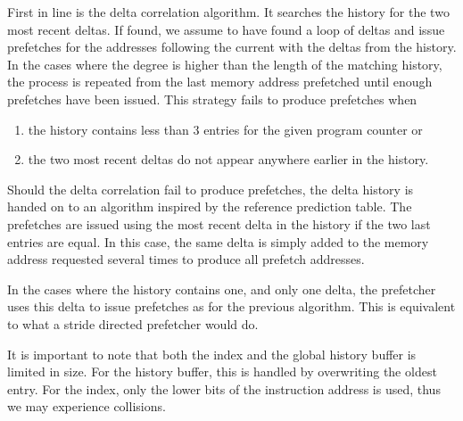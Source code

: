 First in line is the delta correlation algorithm.
It searches the history for the two most recent deltas.
If found, we assume to have found a loop of deltas and issue prefetches for the
addresses following the current with the deltas from the history.
In the cases where the degree is higher than the length of the matching history,
the process is repeated from the last memory address prefetched until enough
prefetches have been issued.
This strategy fails to produce prefetches when

\begin{enumerate}
	\item the history contains less than 3 entries for the given program
		counter or
	\item the two most recent deltas do not appear anywhere earlier in the
		history.
\end{enumerate}

Should the delta correlation fail to produce prefetches, the delta history is
handed on to an algorithm inspired by the reference prediction table.
The prefetches are issued using the most recent delta in the history if the two
last entries are equal.
In this case, the same delta is simply added to the memory address requested
several times to produce all prefetch addresses.

In the cases where the history contains one, and only one delta, the prefetcher
uses this delta to issue prefetches as for the previous algorithm.
This is equivalent to what a stride directed prefetcher would do.

It is important to note that both the index and the global history buffer is
limited in size. For the history buffer, this is handled by overwriting the
oldest entry. For the index, only the lower bits of the instruction address is
used, thus we may experience collisions.

